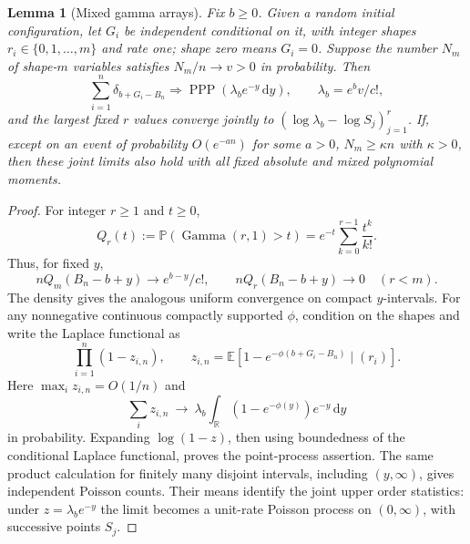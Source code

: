 \documentclass[11pt]{article}
\newtheorem{lemma}[theorem]{Lemma}
\theoremstyle{remark}\newtheorem{remark}[theorem]{Remark}
\newcommand{\Pbb}{\mathbb P}
\newcommand{\Ebb}{\mathbb E}
\newcommand{\Rbb}{\mathbb R}
\newcommand{\dd}{\,\mathrm d}
\begin{document}
\begin{lemma}[Mixed gamma arrays]\label{lem:gamma}
Fix $b\ge0$. Given a random initial configuration, let $G_i$ be independent
conditional on it, with integer shapes $r_i\in\{0,1,\ldots,m\}$ and rate one;
shape zero means $G_i=0$. Suppose the number $N_m$ of shape-$m$ variables
satisfies $N_m/n\to v>0$ in probability. Then
\[
 \sum_{i=1}^n\delta_{b+G_i-B_n}
 \Longrightarrow \operatorname{PPP}(\lambda_b e^{-y}\dd y),
 \qquad \lambda_b=e^b v/c!,
\]
and the largest fixed $r$ values converge jointly to
$(\log\lambda_b-\log S_j)_{j=1}^r$.
If, except on an event of probability $O(e^{-a n})$ for some $a>0$,
$N_m\ge\kappa n$ with $\kappa>0$, then these joint limits also hold with
all fixed absolute and mixed polynomial moments.
\end{lemma}
\begin{proof}
For integer $r\ge1$ and $t\ge0$,
\begin{equation}\label{eq:gammatail}
 Q_r(t):=\Pbb(\operatorname{Gamma}(r,1)>t)
       =e^{-t}\sum_{k=0}^{r-1}\frac{t^k}{k!}.
\end{equation}
Thus, for fixed $y$,
\[
 n Q_m(B_n-b+y)\longrightarrow e^{b-y}/c!,\qquad
 n Q_r(B_n-b+y)\longrightarrow0\quad(r<m).
\]
The density gives the analogous uniform convergence on compact $y$-intervals.
For any nonnegative continuous compactly supported $\phi$, condition on the
shapes and write the Laplace functional as
\[
 \prod_{i=1}^n(1-z_{i,n}),\qquad
 z_{i,n}=\Ebb[1-e^{-\phi(b+G_i-B_n)}\mid(r_i)].
\]
Here $\max_i z_{i,n}=O(1/n)$ and
\[
 \sum_i z_{i,n}\ \longrightarrow\
 \lambda_b\int_{\Rbb}(1-e^{-\phi(y)})e^{-y}\dd y
\]
in probability. Expanding $\log(1-z)$, then using boundedness of the
conditional Laplace functional, proves the point-process assertion.
The same product calculation for finitely many disjoint intervals, including
$(y,\infty)$, gives independent Poisson counts. Their means identify the joint
upper order statistics: under $z=\lambda_b e^{-y}$ the limit becomes a
unit-rate Poisson process on $(0,\infty)$, with successive points $S_j$.


\end{proof}
\end{document}
